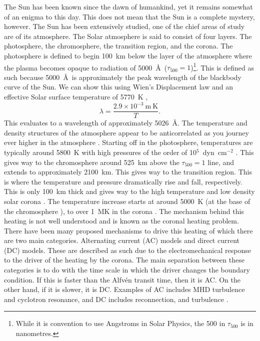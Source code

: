 The Sun has been known since the dawn of humankind, yet it remains somewhat of an enigma to this day. This does not mean that the Sun is a complete mystery, however. The Sun has been extensively studied, one of the chief areas of study are of its atmosphere. The Solar atmosphere is said to consist of four layers. The photosphere, the chromosphere, the transition region, and the corona. The photosphere is defined to begin 100~km below the layer of the atmosphere where the plasma becomes opaque to radiation of 5000~\AA\ ($\tau_{500}=1$)\footnote{While it is convention to use Angstroms in Solar Physics, the 500 in $\tau_{500}$ is in nanometres.}. This is defined as such because 5000~\AA\ is approximately the peak wavelength of the blackbody curve of the Sun. We can show this using Wien's Displacement law  and an effective Solar surface temperature of 5770~K \citep{woan_cambridge_2000}, 
\begin{equation}
    \lambda=\frac{2.9\times10^{-3}~\mathrm{m~K}}{T}.
    \label{wdl}
\end{equation}
This evaluates to a wavelength of approximately 5026~\AA. The temperature and density structures of the atmosphere appear to be anticorrelated as you journey ever higher in the atmosphere . Starting off in the photosphere, temperatures are typically around 5800~K with high pressures of the order of 10$^{5}$~dyn~cm$^{-2}$ \citep{aschwanden_physics_2004}. This gives way to the chromosphere around 525~km above the $\tau_{500}=1$ line, and extends to approximately 2100~km. This gives way to the transition region. This is where the temperature and pressure dramatically rise and fall, respectively. This is only 100~km thick and gives way to the high temperature and low density solar corona \citep{carroll_introduction_2007}. The temperature increase starts at around 5000~K (at the base of the chromosphere \citep{bray_solar_1974}), to over 1~MK in the corona \citep{zirin_solar_1966}. The mechanism behind this heating is not well understood and is known as the coronal heating problem. There have been many proposed mechanisms to drive this heating of which there are two main categories. Alternating current (AC) models and direct current (DC) models. These are described as such due to the electromechanical response to the driver of the heating by the corona. The main separation between these categories is to do with the time scale in which the driver changes the boundary condition. If this is faster than the Alfv\'{e}n transit time, then it is AC. On the other hand, if it is slower, it is DC. Examples of AC includes MHD turbulence and cyclotron resonance, and DC includes reconnection, and turbulence \citep{aschwanden_physics_2004}.

